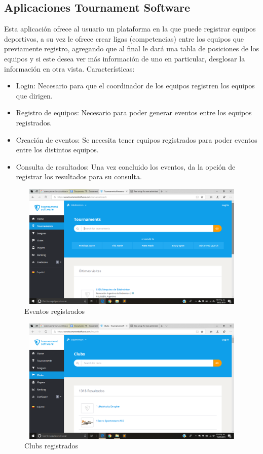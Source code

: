 \subsection{Aplicaciones Tournament Software}
\noindent Esta aplicación ofrece al usuario un plataforma en la que puede registrar equipos deportivos, a su vez le ofrece crear ligas (competencias) entre los equipos que previamente registro, agregando que al final le dará una tabla de posiciones de los equipos y si este desea ver más información de uno en particular, desglosar la información en otra vista. \cite{ts}
Características: 
\begin{itemize}
	\item Login: Necesario para que el coordinador de los equipos registren los equipos que dirigen.
	\item Registro de equipos: Necesario para poder generar eventos entre los equipos registrados.
	\item Creación de eventos: Se necesita tener equipos registrados para poder eventos entre los distintos equipos.
	\item Consulta de resultados: Una vez concluido los eventos, da la opción de registrar los resultados para su consulta.
\end{itemize}
\pagebreak
\begin{figure}[h]
	\centering
	\includegraphics[width=12cm, height=6cm]{Imagenes/Aplicaciones/ToS1.png}
	\caption{Eventos registrados}
\end{figure}
\begin{figure}[h]
	\centering
	\includegraphics[width=12cm, height=6cm]{Imagenes/Aplicaciones/ToS2.png}
	\caption{Clubs registrados}
\end{figure}
